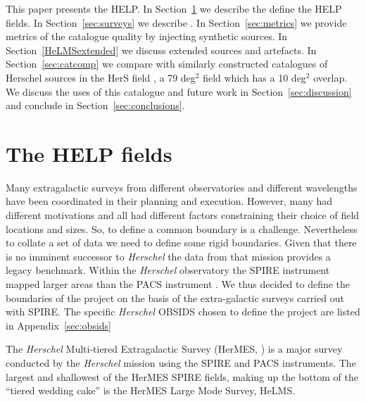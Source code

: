 \documentclass[usenatbib]{mnras}
\newcommand{\Herschel}{\textit{Herschel} }
\begin{document}
This paper presents the HELP. In Section~\ref{sec:fields} we describe the define
the HELP fields.   In Section~\ref{sec:surveys} we describe . In
Section~\ref{sec:metrics} we provide metrics of the catalogue quality by
injecting synthetic sources.   In Section~\ref{HeLMSextended} we discuss
extended sources and artefacts. In Section~\ref{sec:catcomp} we compare with
similarly constructed catalogues of Herschel sources in the  HerS field
\cite{Viero:2014lr}, a 79 deg$^2$ field which has a 10 deg$^2$ overlap.  We
discuss the uses of this catalogue and future work in
Section~\ref{sec:discussion} and conclude in Section~\ref{sec:conclusions}.


\section[The HELP fields.  
\\
{\color{red}A section that copies the figure used in Raph's paper, but goes into more detail about the nature of each of the fields, e.g. with the percentiles of dust intensities from the Planck maps and provides the definitive MOCs for the (DR1) survey boundaries (electronically)}]
{The HELP fields}\label{sec:fields}

Many extragalactic surveys from different observatories and different
wavelengths have been coordinated in their planning and execution. However, many
had different motivations and all had different factors constraining their
choice of field locations and sizes. So, to define a common boundary is
a challenge.  Nevertheless to collate a set of data we need to define some rigid
boundaries. Given that there is no imminent successor to  \Herschel  the data
from that mission provides a legacy benchmark.  Within the \Herschel observatory
the SPIRE instrument \citep{Griffin:2010lr} mapped larger areas than the PACS
instrument \citep{Poglitsch:2010lr}. We thus decided to define the boundaries of
the project on the basis of the extra-galactic surveys carried out with SPIRE.
The specific \Herschel OBSIDS chosen to define the project are listed in
Appendix~\ref{sec:obsids}

The \Herschel Multi-tiered Extragalactic Survey (HerMES, \citealt{Oliver:2012})
is a major survey conducted by the \Herschel mission\citep{Pilbratt:2010lr}
using the SPIRE \citep{Griffin:2010lr} and PACS \citep{Poglitsch:2010lr}
instruments.  The largest and shallowest of the HerMES SPIRE fields, making up
the bottom of the ``tiered wedding cake''  is the HerMES Large Mode Survey,
HeLMS.
\end{document}
